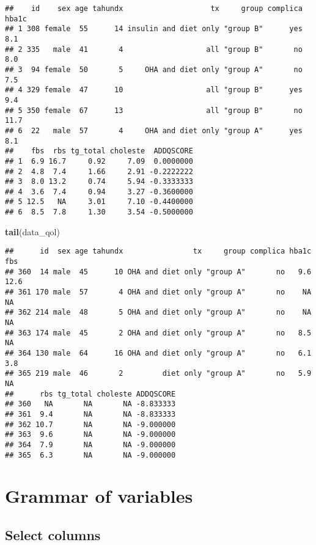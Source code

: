\documentclass[]{book}
\newenvironment{Shaded}{\begin{snugshade}}{\end{snugshade}}
\newcommand{\KeywordTok}[1]{\textcolor[rgb]{0.13,0.29,0.53}{\textbf{#1}}}
\newcommand{\NormalTok}[1]{#1}
\theoremstyle{definition}
\theoremstyle{definition}
\theoremstyle{remark}
\begin{document}
\begin{verbatim}
##    id    sex age tahundx                    tx     group complica hba1c
## 1 308 female  55      14 insulin and diet only "group B"      yes   8.1
## 2 335   male  41       4                   all "group B"       no   8.0
## 3  94 female  50       5     OHA and diet only "group A"       no   7.5
## 4 329 female  47      10                   all "group B"      yes   9.4
## 5 350 female  67      13                   all "group B"       no  11.7
## 6  22   male  57       4     OHA and diet only "group A"      yes   8.1
##    fbs  rbs tg_total choleste  ADDQSCORE
## 1  6.9 16.7     0.92     7.09  0.0000000
## 2  4.8  7.4     1.66     2.91 -0.2222222
## 3  8.0 13.2     0.74     5.94 -0.3333333
## 4  3.6  7.4     0.94     3.27 -0.3600000
## 5 12.5   NA     3.01     7.10 -0.4400000
## 6  8.5  7.8     1.30     3.54 -0.5000000
\end{verbatim}

\begin{Shaded}
\begin{Highlighting}[]
\KeywordTok{tail}\NormalTok{(data_qol)}
\end{Highlighting}
\end{Shaded}

\begin{verbatim}
##      id  sex age tahundx                tx     group complica hba1c  fbs
## 360  14 male  45      10 OHA and diet only "group A"       no   9.6 12.6
## 361 170 male  57       4 OHA and diet only "group A"       no    NA   NA
## 362 214 male  48       5 OHA and diet only "group A"       no    NA   NA
## 363 174 male  45       2 OHA and diet only "group A"       no   8.5   NA
## 364 130 male  64      16 OHA and diet only "group A"       no   6.1  3.8
## 365 219 male  46       2         diet only "group A"       no   5.9   NA
##      rbs tg_total choleste ADDQSCORE
## 360   NA       NA       NA -8.833333
## 361  9.4       NA       NA -8.833333
## 362 10.7       NA       NA -9.000000
## 363  9.6       NA       NA -9.000000
## 364  7.9       NA       NA -9.000000
## 365  6.3       NA       NA -9.000000
\end{verbatim}

\section{Grammar of variables}\label{grammar-of-variables}

\subsection{Select columns}\label{select-columns}
\end{document}

